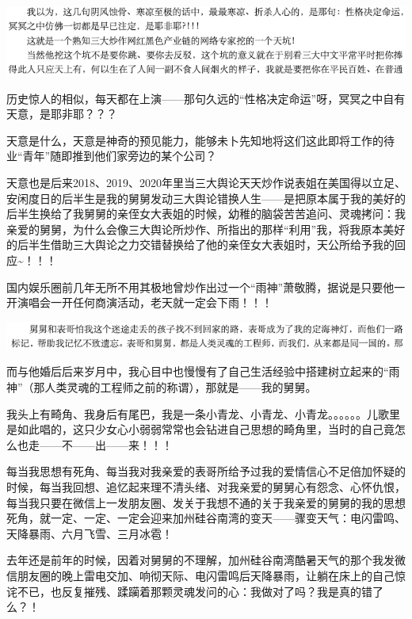 \documentclass[9pt, b5paper]{article}
\begin{document}
\begin{center}
\includegraphics[width=.9\linewidth]{./pic/backups_plans_20210428_094132.png}
\end{center}

历史惊人的相似，每天都在上演——那句久远的“性格决定命运”呀，冥冥之中自有天意，是耶非耶？？？

天意是什么，天意是神奇的预见能力，能够未卜先知地将这们这此即将工作的待业“青年”随即推到他们家旁边的某个公司？

天意也是后来2018、2019、2020年里当三大舆论天天炒作说表姐在美国得以立足、安闲度日的后半生是我的舅舅发动三大舆论错换人生——是把原本属于我的美好的后半生换给了我舅舅的亲侄女大表姐的时候，幼稚的脑袋苦苦追问、灵魂拷问：我亲爱的舅舅，为什么会像三大舆论所炒作、所指出的那样“利用”我，将我原本美好的后半生借助三大舆论之力交错替换给了他的亲侄女大表姐时，天公所给予我的回应\textasciitilde{}！！！

国内娱乐圈前几年无所不用其极地曾炒作出过一个“雨神”萧敬腾，据说是只要他一开演唱会一开任何商演活动，老天就一定会下雨！！！

\begin{center}
\includegraphics[width=.9\linewidth]{./pic/backups_plans_20210428_095419.png}
\end{center}

而与他婚后后来岁月中，我心目中也慢慢有了自己生活经验中搭建树立起来的“雨神”（那人类灵魂的工程师之前的称谓），那就是——我的舅舅。

我头上有畸角、我身后有尾巴，我是一条小青龙、小青龙、小青龙。。。。。。儿歌里是如此唱的，这只少女心小弱弱常常也会钻进自己思想的畸角里，当时的自己竟怎么也走——不——出——来！！！

每当我思想有死角、每当我对我亲爱的表哥所给予过我的爱情信心不足倍加怀疑的时候，每当我回想、追忆起来理不清头绪、对我亲爱的舅舅心有怨念、心怀仇恨，每当我只要在微信上一发朋友圈、发关于我想不通的关于我亲爱的舅舅的我的思想死角，就一定、一定、一定会迎来加州硅谷南湾的变天——骤变天气：电闪雷鸣、天降暴雨、六月飞雪、三月冰雹！

去年还是前年的时候，因着对舅舅的不理解，加州硅谷南湾酷暑天气的那个我发微信朋友圈的晚上雷电交加、响彻天际、电闪雷鸣后天降暴雨，让躺在床上的自己惊诧不已，也反复摧残、蹂躏着那颗灵魂发问的心：我做对了吗？我是真的错了么？！
\end{document}
